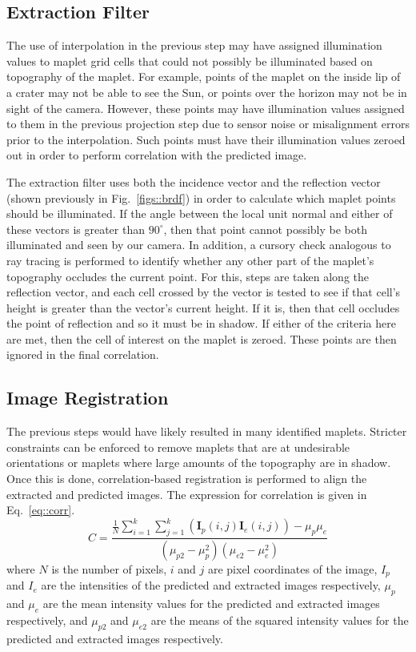 \documentclass{src/RPI-SIW}
\begin{document}
\subsection*{Extraction Filter}
The use of interpolation in the previous step may have assigned illumination values to maplet grid cells that could not possibly be illuminated based on topography of the maplet.  For example, points of the maplet on the inside lip of a crater may not be able to see the Sun, or points over the horizon may not be in sight of the camera.  However, these points may have illumination values assigned to them in the previous projection step due to sensor noise or misalignment errors prior to the interpolation.  Such points must have their illumination values zeroed out in order to perform correlation with the predicted image.

The extraction filter uses both the incidence vector and the reflection vector (shown previously in Fig.~\ref{figs::brdf}) in order to calculate which maplet points should be illuminated.  If the angle between the local unit normal and either of these vectors is greater than $90^{\circ}$, then that point cannot possibly be both illuminated and seen by our camera.  In addition, a cursory check analogous to ray tracing is performed to identify whether any other part of the maplet's topography occludes the current point.  For this, steps are taken along the reflection vector, and each cell crossed by the vector is tested to see if that cell's height is greater than the vector's current height.  If it is, then that cell occludes the point of reflection and so it must be in shadow.  If either of the criteria here are met, then the cell of interest on the maplet is zeroed.  These points are then ignored in the final correlation.

\subsection*{Image Registration}
The previous steps would have likely resulted in many identified maplets.  Stricter constraints can be enforced to remove maplets that are at undesirable orientations or maplets where large amounts of the topography are in shadow.  Once this is done, correlation-based registration is performed to align the extracted and predicted images.  The expression for correlation is given in Eq.~\eqref{eq::corr}.
\begin{equation} \label{eq::corr}
	C = \frac{\frac{1}{N}\sum_{i=1}^k\sum_{j=1}^k (\mathbf{I}_{p}(i,j)\mathbf{I}_{e}(i,j)) - \mu_{p}\mu_{e}}{(\mu_{p2} - \mu_{p}^2)(\mu_{e2} - \mu_{e}^2)}
\end{equation}
where $N$ is the number of pixels, $i$ and $j$ are pixel coordinates of the image, $I_{p}$ and $I_{e}$ are the intensities of the predicted and extracted images respectively, $\mu_{p}$ and $\mu_{e}$ are the mean intensity values for the predicted and extracted images respectively, and $\mu_{p2}$ and $\mu_{e2}$ are the means of the squared intensity values for the predicted and extracted images respectively.
\end{document}
